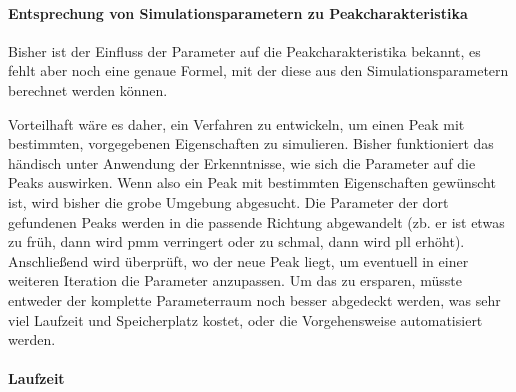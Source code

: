 % 
% 
% 


\paragraph{Entsprechung von Simulationsparametern zu Peakcharakteristika}
Bisher ist der Einfluss der Parameter auf die Peakcharakteristika bekannt, es fehlt aber noch eine genaue Formel, mit der diese aus den Simulationsparametern berechnet werden können. 

Vorteilhaft wäre es daher, ein Verfahren zu entwickeln, um einen Peak mit bestimmten, vorgegebenen Eigenschaften zu simulieren. Bisher funktioniert das händisch unter Anwendung der Erkenntnisse, wie sich die Parameter auf die Peaks auswirken. Wenn also ein Peak mit bestimmten Eigenschaften gewünscht ist, wird bisher die grobe Umgebung abgesucht. Die Parameter der dort gefundenen Peaks werden in die passende Richtung abgewandelt (zb. er ist etwas zu früh, dann wird pmm verringert oder zu schmal, dann wird pll erhöht). Anschließend wird überprüft, wo der neue Peak liegt, um eventuell in einer weiteren Iteration die Parameter anzupassen. 
Um das zu ersparen, müsste entweder der komplette Parameterraum noch besser abgedeckt werden, was sehr viel Laufzeit und Speicherplatz kostet, oder die Vorgehensweise automatisiert werden.

\paragraph{Laufzeit}

